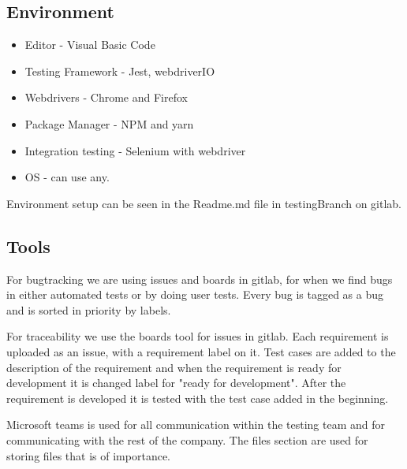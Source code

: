 \subsection{Environment}
\begin{itemize}
    \item Editor - Visual Basic Code
    \item Testing Framework - Jest, webdriverIO
    \item Webdrivers - Chrome and Firefox
    \item Package Manager - NPM and yarn
    \item Integration testing - Selenium with webdriver
    \item OS - can use any.
\end{itemize}

Environment setup can be seen in the Readme.md file in testingBranch on gitlab. 

\subsection{Tools}
For bugtracking we are using issues and boards in gitlab, for when we find bugs in either automated tests or by doing user tests. Every bug is tagged as a bug and is sorted in priority by labels. 

For traceability we use the boards tool for issues in gitlab. Each requirement is uploaded as an issue, with a requirement label on it. Test cases are added to the description of the requirement and when the requirement is ready for development it is changed label for  "ready for development". After the requirement is developed it is tested with the test case added in the beginning. 

Microsoft teams is used for all communication within the testing team and for communicating with the rest of the company. The files section are used for storing files that is of importance.


